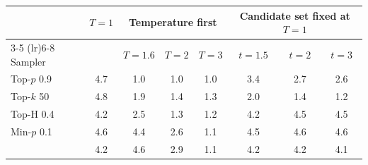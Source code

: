 \begin{tabular}{lccccccc}
\toprule
 & $T{=}1$ & \multicolumn{3}{c}{Temperature first} & \multicolumn{3}{c}{Candidate set fixed at $T{=}1$} \\
\cmidrule(lr){3-5} \cmidrule(lr){6-8}
Sampler & & $T{=}1.6$ & $T{=}2$ & $T{=}3$ & $t{=}1.5$ & $t{=}2$ & $t{=}3$ \\
\midrule
Top-$p$ 0.9 & 4.7 & 1.0 & 1.0 & 1.0 & 3.4 & 2.7 & 2.6 \\
Top-$k$ 50 & 4.8 & 1.9 & 1.4 & 1.3 & 2.0 & 1.4 & 1.2 \\
Top-H 0.4 & 4.2 & 2.5 & 1.3 & 1.2 & 4.2 & 4.5 & 4.5 \\
Min-$p$ 0.1 & 4.6 & 4.4 & 2.6 & 1.1 & 4.5 & 4.6 & 4.6 \\
\pless{} & 4.2 & 4.6 & 2.9 & 1.1 & 4.2 & 4.2 & 4.1 \\
\bottomrule
\end{tabular}
